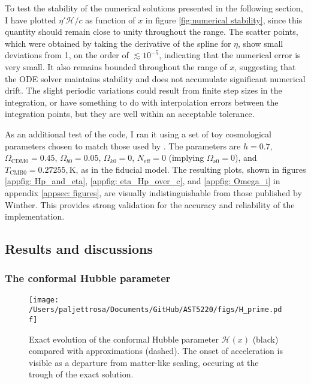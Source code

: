 \documentclass{aa}
\numberwithin{equation}{section}
\numberwithin{table}{section}
\numberwithin{figure}{section}
\begin{document}
To test the stability of the numerical solutions presented in the following section, I have plotted $\eta'\mathcal{H}/c$ as function of $x$ in figure \ref{fig:numerical stability}, since this quantity should remain close to unity throughout the range. The scatter points, which were obtained by taking the derivative of the spline for $\eta$, show small deviations from 1, on the order of $\lesssim 10^{-5}$, indicating that the numerical error is very small. It also remains bounded throughout the range of $x$, suggesting that the ODE solver maintains stability and does not accumulate significant numerical drift. The slight periodic variations could result from finite step sizes in the integration, or have something to do with interpolation errors between the integration points, but they are well within an acceptable tolerance.

As an additional test of the code, I ran it using a set of toy cosmological parameters chosen to match those used by \cite{Course}. The parameters are $h = 0.7$, $\Omega_\text{CDM0} = 0.45$, $\Omega_{b0} = 0.05$, $\Omega_{k0} = 0$, $N_\text{eff} = 0$ (implying $\Omega_{\nu0} = 0$), and $T_\text{CMB0} = 0.27255,\text{K}$, as in the fiducial model. The resulting plots, shown in figures \ref{appfig: Hp_and_eta}, \ref{appfig: eta_Hp_over_c}, and \ref{appfig: Omega_i} in appendix \ref{appsec: figures}, are visually indistinguishable from those published by Winther. This provides strong validation for the accuracy and reliability of the implementation.


\subsection{Results and discussions}\label{subsec: I results}

\subsubsection{The conformal Hubble parameter}
\begin{figure}
  \centering
  \texttt{[image: /Users/paljettrosa/Documents/GitHub/AST5220/figs/H\_prime.pdf]}
  \caption{Exact evolution of the conformal Hubble parameter $\mathcal{H}(x)$ (black) compared with approximations (dashed). The onset of acceleration is visible as a departure from matter-like scaling, occuring at the trough of the exact solution.}\label{fig:H_prime}
\end{figure}
\end{document}
